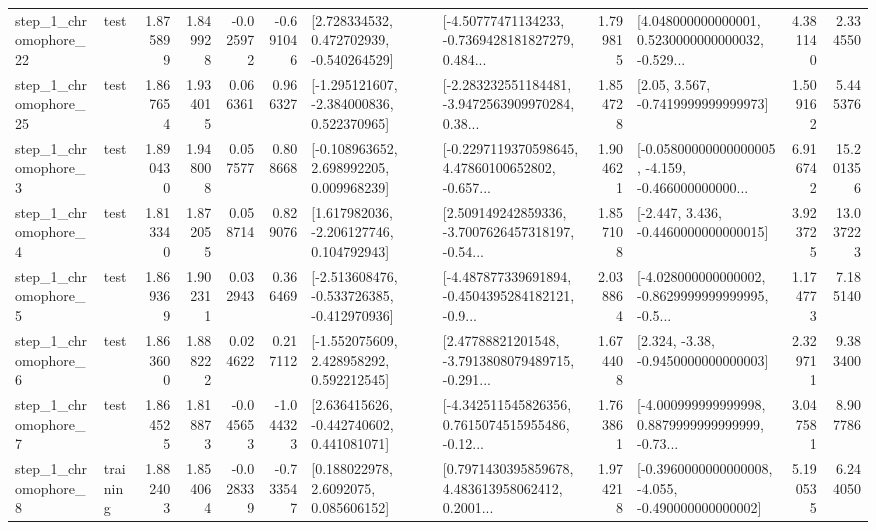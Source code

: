 \begin{tabular}{llrrrrllrlrr}
    step\_1\_chromophore\_22 &      test &      1.875899 &    1.849928 &     -0.025972 & -0.691046 &    [2.728334532, 0.472702939, -0.540264529] &  [-4.50777471134233, -0.7369428181827279, 0.484... &       1.799815 &  [4.048000000000001, 0.5230000000000032, -0.529... &            4.381140 &          2.334550 \\
    step\_1\_chromophore\_25 &      test &      1.867654 &    1.934015 &      0.066361 &  0.966327 &   [-1.295121607, -2.384000836, 0.522370965] &  [-2.283232551184481, -3.9472563909970284, 0.38... &       1.854728 &                 [2.05, 3.567, -0.7419999999999973] &            1.509162 &          5.445376 \\
     step\_1\_chromophore\_3 &      test &      1.890430 &    1.948008 &      0.057577 &  0.808668 &    [-0.108963652, 2.698992205, 0.009968239] &  [-0.2297119370598645, 4.47860100652802, -0.657... &       1.904621 &  [-0.05800000000000005, -4.159, -0.466000000000... &            6.916742 &         15.201356 \\
     step\_1\_chromophore\_4 &      test &      1.813340 &    1.872055 &      0.058714 &  0.829076 &    [1.617982036, -2.206127746, 0.104792943] &  [2.509149242859336, -3.7007626457318197, -0.54... &       1.857108 &               [-2.447, 3.436, -0.4460000000000015] &            3.923725 &         13.037223 \\
     step\_1\_chromophore\_5 &      test &      1.869369 &    1.902311 &      0.032943 &  0.366469 &  [-2.513608476, -0.533726385, -0.412970936] &  [-4.487877339691894, -0.4504395284182121, -0.9... &       2.038864 &  [-4.028000000000002, -0.8629999999999995, -0.5... &            1.174773 &          7.185140 \\
     step\_1\_chromophore\_6 &      test &      1.863600 &    1.888222 &      0.024622 &  0.217112 &    [-1.552075609, 2.428958292, 0.592212545] &  [2.47788821201548, -3.7913808079489715, -0.291... &       1.674408 &                [2.324, -3.38, -0.9450000000000003] &            2.329711 &          9.383400 \\
     step\_1\_chromophore\_7 &      test &      1.864525 &    1.818873 &     -0.045653 & -1.044323 &    [2.636415626, -0.442740602, 0.441081071] &  [-4.342511545826356, 0.7615074515955486, -0.12... &       1.763861 &  [-4.000999999999998, 0.8879999999999999, -0.73... &            3.047581 &          8.907786 \\
     step\_1\_chromophore\_8 &  training &      1.882403 &    1.854064 &     -0.028339 & -0.733547 &       [0.188022978, 2.6092075, 0.085606152] &  [0.7971430395859678, 4.483613958062412, 0.2001... &       1.974218 &  [-0.3960000000000008, -4.055, -0.490000000000002] &            5.190535 &          6.244050 \\

\end{tabular}
